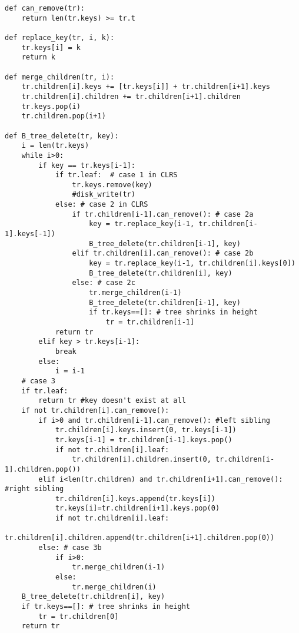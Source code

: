 \documentclass{article}
\begin{document}
\lstset{language=Python}
\begin{lstlisting}
def can_remove(tr):
    return len(tr.keys) >= tr.t

def replace_key(tr, i, k):
    tr.keys[i] = k
    return k

def merge_children(tr, i):
    tr.children[i].keys += [tr.keys[i]] + tr.children[i+1].keys
    tr.children[i].children += tr.children[i+1].children
    tr.keys.pop(i)
    tr.children.pop(i+1)

def B_tree_delete(tr, key):
    i = len(tr.keys)
    while i>0:
        if key == tr.keys[i-1]:
            if tr.leaf:  # case 1 in CLRS
                tr.keys.remove(key)
                #disk_write(tr)
            else: # case 2 in CLRS
                if tr.children[i-1].can_remove(): # case 2a
                    key = tr.replace_key(i-1, tr.children[i-1].keys[-1])
                    B_tree_delete(tr.children[i-1], key)
                elif tr.children[i].can_remove(): # case 2b
                    key = tr.replace_key(i-1, tr.children[i].keys[0])
                    B_tree_delete(tr.children[i], key)
                else: # case 2c
                    tr.merge_children(i-1)
                    B_tree_delete(tr.children[i-1], key)
                    if tr.keys==[]: # tree shrinks in height
                        tr = tr.children[i-1]
            return tr
        elif key > tr.keys[i-1]:
            break
        else:
            i = i-1
    # case 3
    if tr.leaf:
        return tr #key doesn't exist at all
    if not tr.children[i].can_remove():
        if i>0 and tr.children[i-1].can_remove(): #left sibling
            tr.children[i].keys.insert(0, tr.keys[i-1])
            tr.keys[i-1] = tr.children[i-1].keys.pop()
            if not tr.children[i].leaf:
                tr.children[i].children.insert(0, tr.children[i-1].children.pop())
        elif i<len(tr.children) and tr.children[i+1].can_remove(): #right sibling
            tr.children[i].keys.append(tr.keys[i])
            tr.keys[i]=tr.children[i+1].keys.pop(0)
            if not tr.children[i].leaf:
                tr.children[i].children.append(tr.children[i+1].children.pop(0))
        else: # case 3b
            if i>0:
                tr.merge_children(i-1)
            else:
                tr.merge_children(i)
    B_tree_delete(tr.children[i], key)
    if tr.keys==[]: # tree shrinks in height
        tr = tr.children[0]
    return tr
\end{lstlisting}

\end{document}
